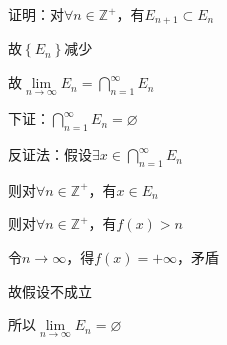 \noindent 证明：对$\forall n \in \mathbb{Z}^{+}$，有$E_{n+1}\subset E_{n}$
\par \quad 故$\left\{E_{n}\right\}$减少
\par \quad 故$\lim \limits_{n \to \infty} E_{n} = \bigcap \limits_{n=1}^{\infty}E_{n} $
\par \quad 下证：$\bigcap \limits_{n=1}^{\infty}E_{n} = \varnothing $
\par \quad 反证法：假设$\exists x \in \bigcap \limits_{n=1}^{\infty}E_{n}$
\par \quad \quad \quad \quad \quad 则对$\forall n \in \mathbb{Z}^{+}$，有$x \in E_{n}$
\par \quad \quad \quad \quad \quad 则对$\forall n \in \mathbb{Z}^{+}$，有$ f(x) > n$
\par \quad \quad \quad \quad \quad 令$n \to \infty$，得$f(x) = + \infty$，矛盾
\par \quad \quad \quad \quad \quad 故假设不成立
\par \quad \quad \quad \quad \quad 所以$\lim \limits_{n \to \infty} E_{n} = \varnothing $